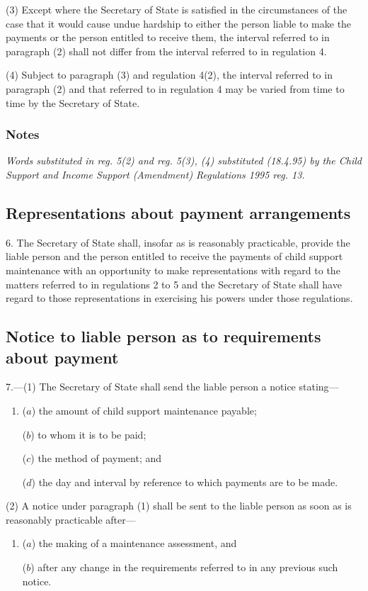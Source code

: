 \documentclass[a4paper]{article}
\newcommand\amendment[1]{\subsubsection*{Notes}{\itshape\frenchspacing\footnotesize #1 \par}}
\begin{document}
(3) Except where the Secretary of State is satisfied in the circumstances of the case that it would cause undue hardship to either the person liable to make the payments or the person entitled to receive them, the interval referred to in paragraph (2) shall not differ from the interval referred to in regulation 4.

(4) Subject to paragraph (3) and regulation 4(2), the interval referred to in paragraph (2) and that referred to in regulation 4 may be varied from time to time by the Secretary of State.

\amendment{
Words substituted in reg. 5(2) and reg. 5(3), (4) substituted (18.4.95) by the Child Support and Income Support (Amendment) Regulations 1995 reg. 13.
}

\subsection[6. Representations about payment arrangements]{Representations about payment arrangements}

6.  The Secretary of State shall, insofar as is reasonably practicable, provide the liable person and the person entitled to receive the payments of child support maintenance with an opportunity to make representations with regard to the matters referred to in regulations 2 to 5 and the Secretary of State shall have regard to those representations in exercising his powers under those regulations.

\subsection[7. Notice to liable person as to requirements about payment]{Notice to liable person as to requirements about payment}

7.—(1) The Secretary of State shall send the liable person a notice stating—
\begin{enumerate}\item[]
($a$) the amount of child support maintenance payable;

($b$) to whom it is to be paid;

($c$) the method of payment; and

($d$) the day and interval by reference to which payments are to be made.
\end{enumerate}

(2) A notice under paragraph (1) shall be sent to the liable person as soon as is reasonably practicable after—
\begin{enumerate}\item[]
($a$) the making of a maintenance assessment, and

($b$) after any change in the requirements referred to in any previous such notice.
\end{enumerate}
\end{document}
